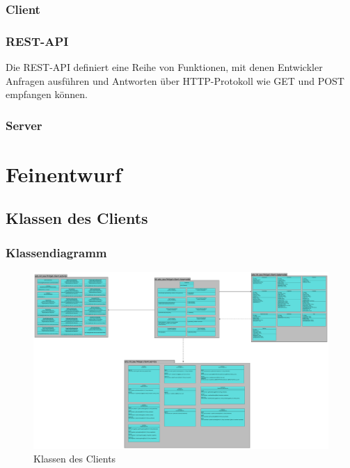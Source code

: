 \documentclass[a4paper]{scrreprt}
\begin{document}
		 \subsection{Client}
	 		
	 		
	 	 \subsection{REST-API}
	 	 	Die REST-API definiert eine Reihe von Funktionen, mit denen Entwickler Anfragen ausführen und Antworten über HTTP-Protokoll wie GET und POST empfangen können.
	 	 	
	  \newpage
		
		 \subsection{Server}
	 	 	
	 	 
        
\newpage

\chapter{Feinentwurf}
	\section{Klassen des Clients}
	\subsection{Klassendiagramm}
	\begin{figure}[H]
	       \centering
	       \includegraphics[scale = .11]{all_client_packages.png}
	       \caption{Klassen des Clients}
	      \end{figure}
	
\end{document}
